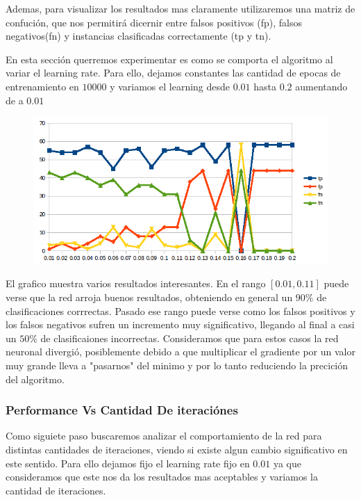 Ademas, para visualizar los resultados mas claramente utilizaremos una matriz de confución, que nos permitirá dicernir entre falsos positivos (fp), falsos negativos(fn) y instancias clasificadas correctamente (tp y tn).

\reescribir 

En esta sección querremos experimentar es como se comporta el algoritmo al variar el learning rate. Para ello, dejamos constantes las cantidad de epocas de entrenamiento en $10000$ y variamos el learning desde $0.01$ hasta $0.2$ aumentando de a $0.01$

\begin{figure}[h!]
\centering
\includegraphics[scale=0.4]{ej1_test_learning_rate/1.png}
\end{figure}

El grafico muestra varios resultados interesantes. En el rango $[0.01,0.11]$ puede verse que la red arroja buenos resultados, obteniendo en general un $90\%$ de clasificaciones corrrectas. Pasado ese rango puede verse como los falsos positivos y los falsos negativos sufren un incremento muy significativo, llegando al final a casi un $50\%$ de clasificaiones incorrectas. Consideramos que para estos casos la red neuronal divergió, posiblemente debido a que multiplicar el gradiente por un valor muy grande lleva a "pasarnos" del minimo y por lo tanto reduciendo la precición del algoritmo. \completar

\subsubsection{Performance Vs Cantidad De iteraciónes} 

Como siguiete paso buscaremos analizar el comportamiento de la red para distintas cantidades de iteraciones, viendo si existe algun cambio significativo en este sentido. Para ello dejamos fijo el learning rate fijo en $0.01$ ya que consideramos que este nos da los resultados mas aceptables y variamos la cantidad de iteraciones.

